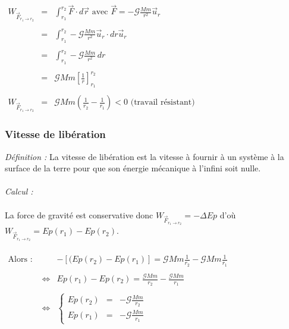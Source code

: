 \documentclass[a4paper,10pt]{book}
\begin{document}
$\begin{array}{rcl} W_{\vec{F}_{r_{1}\rightarrow r_{2}}}&=&\displaystyle \int_{r_{1}}^{r_{2}}\vec{F}\cdot d\vec{r} \text{ avec } \vec{F}=-\mathcal{G}\frac{Mm}{r^{2}}\vec{u}_{r}\\\\
&=& \displaystyle \int_{r_{1}}^{r_{2}}-\mathcal{G}\frac{Mm}{r^{2}}\vec{u}_{r}\cdot dr\vec{u}_{r}\\\\
&=& \displaystyle \int_{r_{1}}^{r_{2}}-\mathcal{G}\frac{Mm}{r^{2}}\,dr\\\\
&=& \mathcal{G}Mm \left[ \frac{1}{r} \right]_{r_{1}}^{r_{2}}\\\\
W_{\vec{F}_{r_{1}\rightarrow r_{2}}} &=& \mathcal{G}Mm(\frac{1}{r_{2}}-\frac{1}{r_{1}}) <0 \text{ (travail résistant)}\end{array}$\\

\subsubsection{Vitesse de libération}
\emph{Définition :} La vitesse de libération est la vitesse à fournir à un système à la surface de la terre pour que son énergie mécanique à l'infini soit nulle.\\\\

\textit{Calcul :}\\\\
La force de gravité est conservative donc $W_{\vec{F}_{r_{1}\rightarrow r_{2}}}=-\Delta Ep$ d'où $W_{\vec{F}_{r_{1}\rightarrow r_{2}}}=Ep(r_{1})-Ep(r_{2})$.\\\\
$\begin{array}{rcl} \text{Alors : }&&-[(Ep(r_{2})-Ep(r_{1})]=\mathcal{G}Mm\frac{1}{r_{2}}-\mathcal{G}Mm\frac{1}{r_{1}}\\\\
&\Leftrightarrow &Ep(r_{1})-Ep(r_{2})=\frac{\mathcal{G}Mm}{r_{2}}-\frac{\mathcal{G}Mm}{r_{1}}\\\\
&\Leftrightarrow &\left \{ \begin{array}{rcl}
Ep(r_{2})&=&-\mathcal{G}\frac{Mm}{r_{2}}\\
Ep(r_{1})&=&-\mathcal{G}\frac{Mm}{r_{1}} \end{array} \right. \end{array}$
\bigskip
\end{document}
